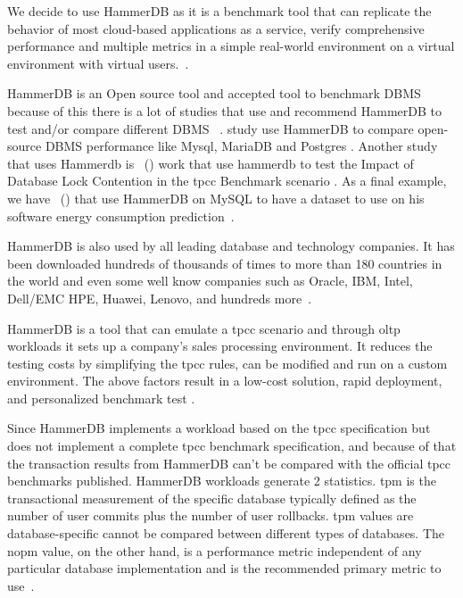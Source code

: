 
We decide to use HammerDB as it is a benchmark tool that can replicate the behavior of most cloud-based applications as a service, verify comprehensive performance and multiple metrics in a simple real-world environment on a virtual environment with virtual users.~\cite{hammerdb}.



HammerDB is an Open source tool and accepted tool to benchmark DBMS because of this there is a lot of studies that use and recommend HammerDB to test and/or compare different DBMS ~\cite{scalzo2018database,elgrablyanalise,knoche2016combining,benchmarkchen,ali2019persistent,yu2015design,koccak2018software,koccak2018software}. \citeauthor{elgrablyanalise} study use HammerDB to compare open-source DBMS performance like Mysql, MariaDB and Postgres \cite{elgrablyanalise}. Another study that uses Hammerdb is \citeauthor{knoche2016combining}~(\citeyear{knoche2016combining}) work that use hammerdb to test the Impact of Database Lock Contention in the \gls{tpcc} Benchmark scenario \cite{knoche2016combining}. As a final example, we have \citeauthor{koccak2018software}~(\citeyear{koccak2018software}) that use HammerDB on MySQL to have a dataset to use on his software energy consumption prediction~\cite{koccak2018software}. 


HammerDB is also used by all leading database and technology companies. It has been downloaded hundreds of thousands of times to more than 180 countries in the world and even some well know companies such as Oracle, IBM, Intel, Dell/EMC HPE, Huawei, Lenovo, and hundreds more~\cite{hammerdb}.



HammerDB is a tool that can emulate a \gls{tpcc} scenario 
and through \gls{oltp} workloads it sets up a company's sales processing environment. It reduces the testing costs by simplifying the \gls{tpcc} rules, can be modified and run on a custom environment. The above factors result in a low-cost solution, rapid deployment, and personalized benchmark test \cite{benchmarkchen,elgrablyanalise,hammerdb}. 

 Since HammerDB implements a workload based on the \gls{tpcc} specification but does not implement a complete \gls{tpcc} benchmark specification, and because of that the transaction results from HammerDB can't be compared with the official \gls{tpcc} benchmarks published. HammerDB workloads generate 2 statistics. \gls{tpm} is the transactional measurement of the specific database typically defined as the number of user commits plus the number of user rollbacks. \gls{tpm} values are database-specific cannot be compared between different types of databases. The \gls{nopm} value, on the other hand, is a performance metric independent of any particular database implementation and is the recommended primary metric to use~\cite{hammerdb}.

